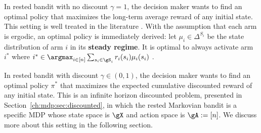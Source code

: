 In rested bandit with no discount $\gamma=1$, the decision maker wants to find an optimal policy that maximizes the long-term average reward of any initial state.
This setting is well treated in the literature \cite{anantharam1987asymptotically, tekin2010online}.
With the assumption that each arm is ergodic, an optimal policy is immediately derived: let $\mu_i\in\Delta^{S_i}$ be the state distribution of arm $i$ in its \textbf{steady regime}.
It is optimal to always activate arm $i^*$ where $i^*\in\argmax_{i\in[n]}\sum_{s_i\in\gS_i}r_i(s_i)\mu_i(s_i)$ \cite{tekin2010online}.


In rested bandit with discount $\gamma\in(0,1)$, the decision maker wants to find an optimal policy $\pi^*$ that maximizes the expected cumulative discounted reward of any initial state.
This is an infinite horizon discounted problem, presented in Section~\ref{ch:mdp:sec:discounted}, in which the rested Markovian bandit is a specific MDP whose state space is $\gX$ and action space is $\gA:=[n]$.
We discuss more about this setting in the following section.

